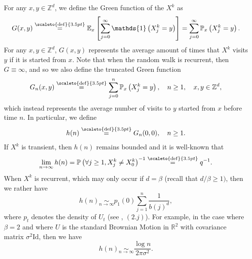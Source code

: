 \documentclass[12pt]{article}
\newcommand{\RR}{\mathbb R}
\newcommand{\EE}{\mathbb E}
\newcommand{\PP}{\mathbb P}
\newcommand{\1}{\mathds{1}}
\newcommand{\ZZ}{\mathbb Z}
\newcommand{\eqdef}{\stackrel{\scaleto{\mathrm{def}}{3.5pt}}{=}}
\numberwithin{equation}{section}
\begin{document}
For any $x,y\in\ZZ^d$, we define the Green function of the $X^k$ as 
\begin{equation*}
    G(x,y)\eqdef\EE_x\left[\sum_{j=0}^\infty\1\left(X_j^k=y\right)\right]=\sum_{j=0}^\infty\PP_x\left(X_j^k=y\right).
\end{equation*}
For any $x,y\in\ZZ^d$, $G(x,y)$ represents the average amount of times that $X^k$ visits $y$ if it is started from $x$. Note that when the random walk is recurrent, then $G\equiv\infty$, and so we also define the truncated Green function
\begin{equation*}
    G_{n}(x,y)\eqdef\sum_{j=0}^n\PP_x\left(X_j^k=y\right),\quad n\ge1,\quad x,y\in\ZZ^d,
\end{equation*}
which instead represents the average number of visits to $y$ started from $x$ before time $n$. In particular, we define
\begin{equation*}
    h(n)\eqdef G_{n}(0,0),\quad n\ge1.
\end{equation*}
If $X^k$ is transient, then $h(n)$ remains bounded and it is well-known that 
\begin{equation*}
    \lim_{n\rightarrow\infty} h(n)=\PP\left(\forall j\ge1, X_j^k\ne X_0^k\right)^{-1}\eqdef q^{-1}.
\end{equation*}
When $X^k$ is recurrent, which may only occur if $d=\beta$ (recall that $d/\beta\ge1)$, then we rather have 
\begin{equation}
\label{limit:trunctaed green's function asymptotics}
    h(n)\underset{n\rightarrow\infty}{\sim}p_1(0)\sum_{j=1}^n\frac{1}{b(j)^d},
\end{equation}
where $p_t$ denotes the density of $U_t$ (see \cite{LeGallRosenRangeOfStableRandomWalks1991}, $(2.j)$). For example, in the case where $\beta=2$ and where $U$ is the standard Brownian Motion in $\RR^2$ with covariance matrix $\sigma^2\mathrm{Id}$, then we have
\begin{equation*}
    h(n)\underset{n\rightarrow\infty}\sim\frac{\log n}{2\pi\sigma^2}.
\end{equation*}
\end{document}
